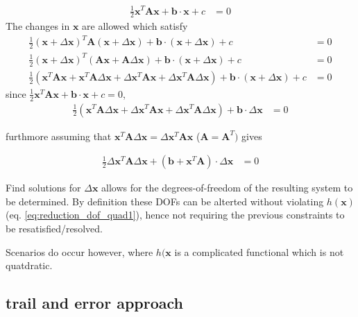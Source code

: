 \documentclass[a4paper,10pt]{article}
\begin{document}
\begin{align}
    \frac{1}{2} \mathbf{x}^T \mathbf{A} \mathbf{x} + \mathbf{b} \cdot \mathbf{x} + c &= 0 \label{eq:reduction_dof_quad1}
\end{align}
The changes in $\mathbf{x}$ are allowed which satisfy
\begin{align}
    \frac{1}{2} (\mathbf{x}+\Delta \mathbf{x})^T \mathbf{A} (\mathbf{x}+\Delta \mathbf{x}) + \mathbf{b} \cdot (\mathbf{x}+\Delta \mathbf{x}) + c &= 0 \label{eq:reduction_dof_quad2} \\
    \frac{1}{2} (\mathbf{x}+\Delta \mathbf{x})^T  ( \mathbf{A} \mathbf{x}+ \mathbf{A} \Delta \mathbf{x}) + \mathbf{b} \cdot (\mathbf{x}+\Delta \mathbf{x}) + c &= 0 \\
    \frac{1}{2} (\mathbf{x}^T \mathbf{A} \mathbf{x} + \mathbf{x}^T \mathbf{A} \Delta \mathbf{x} + \Delta\mathbf{x}^T\mathbf{A}\mathbf{x}+ \Delta\mathbf{x}^T\mathbf{A} \Delta \mathbf{x}) + \mathbf{b} \cdot (\mathbf{x}+\Delta \mathbf{x}) + c &= 0 
\end{align}
since $\frac{1}{2} \mathbf{x}^T \mathbf{A} \mathbf{x} + \mathbf{b} \cdot \mathbf{x} + c = 0$,
\begin{align}
    \frac{1}{2} (\mathbf{x}^T \mathbf{A} \Delta \mathbf{x} + \Delta\mathbf{x}^T\mathbf{A}\mathbf{x}+ \Delta\mathbf{x}^T\mathbf{A} \Delta \mathbf{x}) + \mathbf{b} \cdot \Delta \mathbf{x} &= 0 
\end{align}

furthmore assuming that $\mathbf{x}^T \mathbf{A} \Delta \mathbf{x} = \Delta\mathbf{x}^T\mathbf{A}\mathbf{x}$ ($\mathbf{A} = \mathbf{A} ^T)$ gives

\begin{align}
    \frac{1}{2} \Delta\mathbf{x}^T\mathbf{A} \Delta \mathbf{x} + (\mathbf{b}+\mathbf{x}^T \mathbf{A}) \cdot \Delta \mathbf{x} &= 0 
\end{align}


Find solutions for $\Delta \mathbf{x}$ allows for the degrees-of-freedom of the resulting system to be determined.
By definition these DOFs can be alterted without violating $h(\mathbf{x})$(eq. \ref{eq:reduction_dof_quad1}), hence not requiring the previous constraints to be resatisfied/resolved.

Scenarios do occur however, where $h(\mathbf{x}$ is a complicated functional which is not quatdratic.


\subsection{trail and error approach}
\end{document}
